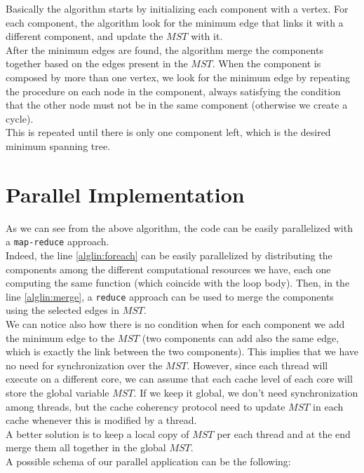 \documentclass[notitlepage]{article}
\begin{document}
Basically the algorithm starts by initializing each component with a vertex. For each component, the algorithm look for the minimum edge that links it with a different component, and update the $MST$ with it.\\
After the minimum edges are found, the algorithm merge the components together based on the edges present in the $MST$. When the component is composed by more than one vertex, we look for the minimum edge by 
repeating the procedure on each node in the component, always satisfying the condition that the other node must not be in the same component (otherwise we create a cycle).\\
This is repeated until there is only one component left, which is the desired minimum spanning tree.

\section{Parallel Implementation}

As we can see from the above algorithm, the code can be easily parallelized with a \texttt{map-reduce} approach.\\
Indeed, the line \ref{alglin:foreach} can be easily parallelized by distributing the components among the different computational resources we have, each one computing the same function
(which coincide with the loop body).
Then, in the line \ref{alglin:merge}, a \texttt{reduce} approach can be used to merge the components using the selected edges in $MST$.\\
We can notice also how there is no condition when for each component we add the minimum edge to the $MST$ (two components can add also the same edge, which is exactly the link between the two components). 
This implies that we have no need for synchronization over the $MST$. However, since each thread will execute on a different core, we can assume that each cache level of each core will store  
the global variable $MST$. If we keep it global, we don't need synchronization among threads, but the cache coherency protocol need to update $MST$ in each cache whenever this is modified by a thread.\\
A better solution is to keep a local copy of $MST$ per each thread and at the end merge them all together in the global $MST$.\\
A possible schema of our parallel application can be the following:
\end{document}
